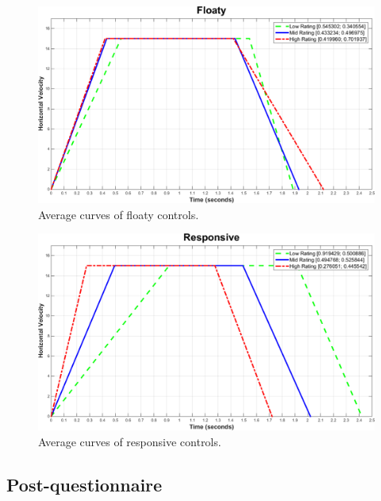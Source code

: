 \begin{figure}[htbp]
\centering
\includegraphics[width=\columnwidth]{Pics/Curves/Floaty_curve}
\caption{Average curves of floaty controls.}
\label{fig:curve_floaty}
\end{figure}

\begin{figure}[htbp]
\centering
\includegraphics[width=\columnwidth]{Pics/Curves/Responsive_curve}
\caption{Average curves of responsive controls.}
\label{fig:curve_responsive}
\end{figure}



\subsection{Post-questionnaire}